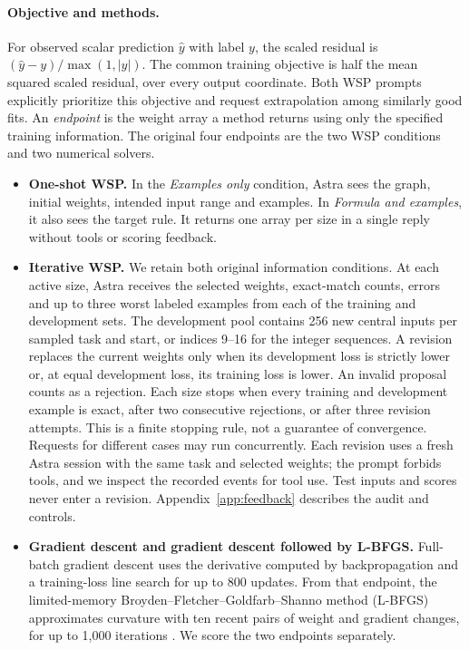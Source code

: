 \paragraph{Objective and methods.}
For observed scalar prediction $\hat y$ with label $y$, the scaled residual is $(\hat y-y)/\max(1,|y|)$. The common training objective is half the mean squared scaled residual, over every output coordinate. Both WSP prompts explicitly prioritize this objective and request extrapolation among similarly good fits. An \emph{endpoint} is the weight array a method returns using only the specified training information. The original four endpoints are the two WSP conditions and two numerical solvers.
\begin{itemize}
\item \textbf{One-shot WSP.} In the \emph{Examples only} condition, Astra sees the graph, initial weights, intended input range and examples. In \emph{Formula and examples}, it also sees the target rule. It returns one array per size in a single reply without tools or scoring feedback.
\item \textbf{Iterative WSP.} We retain both original information conditions. At each active size, Astra receives the selected weights, exact-match counts, errors and up to three worst labeled examples from each of the training and development sets. The development pool contains 256 new central inputs per sampled task and start, or indices 9--16 for the integer sequences. A revision replaces the current weights only when its development loss is strictly lower or, at equal development loss, its training loss is lower. An invalid proposal counts as a rejection. Each size stops when every training and development example is exact, after two consecutive rejections, or after three revision attempts. This is a finite stopping rule, not a guarantee of convergence. Requests for different cases may run concurrently. Each revision uses a fresh Astra session with the same task and selected weights; the prompt forbids tools, and we inspect the recorded events for tool use. Test inputs and scores never enter a revision. Appendix~\ref{app:feedback} describes the audit and controls.
\item \textbf{Gradient descent and gradient descent followed by L-BFGS.} Full-batch gradient descent uses the derivative computed by backpropagation and a training-loss line search for up to 800 updates. From that endpoint, the limited-memory Broyden--Fletcher--Goldfarb--Shanno method (L-BFGS) approximates curvature with ten recent pairs of weight and gradient changes, for up to 1,000 iterations \cite{liu1989limited}. We score the two endpoints separately.

\end{itemize}
